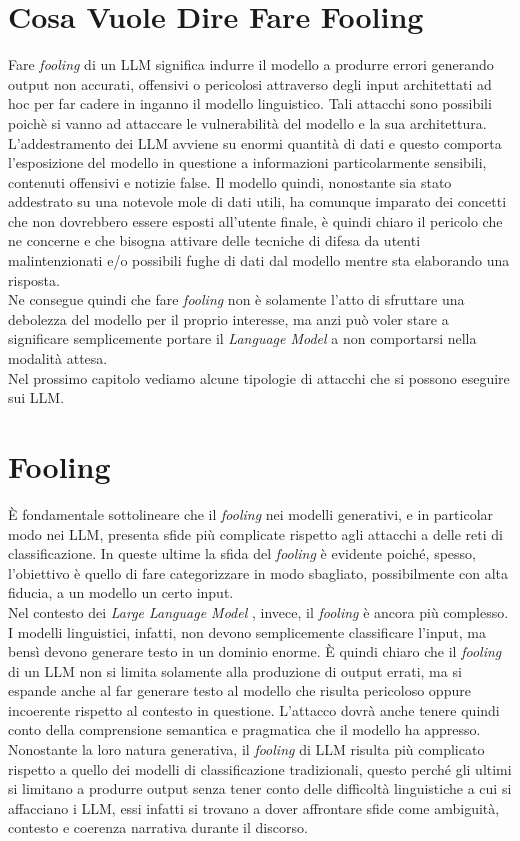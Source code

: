 \section{Cosa Vuole Dire Fare Fooling}
Fare \emph{fooling} di un LLM significa indurre il modello a produrre errori generando output non accurati, offensivi o pericolosi attraverso degli input architettati ad hoc per far cadere in inganno il modello linguistico. Tali attacchi sono possibili poich\`e si vanno ad attaccare le vulnerabilit\`a del modello e la sua architettura. L'addestramento dei LLM avviene su enormi quantit\`a di dati e questo comporta l'esposizione del modello in questione a informazioni particolarmente sensibili, contenuti offensivi e notizie false.
Il modello quindi, nonostante sia stato addestrato su una notevole mole di dati utili, ha comunque imparato dei concetti che non dovrebbero essere esposti all'utente finale, \`e quindi chiaro il pericolo che ne concerne e che bisogna attivare delle tecniche di difesa da utenti malintenzionati e/o possibili fughe di dati dal modello mentre sta elaborando una risposta.\\
Ne consegue quindi che fare \emph{fooling} non \`e solamente l'atto di sfruttare una debolezza del modello per il proprio interesse, ma anzi pu\`o voler stare a significare semplicemente portare il \emph{Language Model} a non comportarsi nella modalit\`a attesa.\\
Nel prossimo capitolo vediamo alcune tipologie di attacchi che si possono eseguire sui LLM.





\section{Fooling}
\`E fondamentale sottolineare che il \emph{fooling} nei modelli generativi, e in particolar modo nei LLM, presenta sfide pi\`u complicate rispetto agli attacchi a delle reti di classificazione. In queste ultime la sfida del \emph{fooling} \`e evidente poich\'e, spesso, l'obiettivo \`e quello di fare categorizzare in modo sbagliato, possibilmente con alta fiducia, a un modello un certo input.\\
Nel contesto dei \emph{Large Language Model} , invece, il \emph{fooling} \`e ancora pi\`u complesso. I modelli linguistici, infatti, non devono semplicemente classificare l'input, ma bens\`i devono generare testo in un dominio enorme. \`E quindi chiaro che il \emph{fooling} di un LLM non si limita solamente alla produzione di output errati, ma si espande anche al far generare testo al modello che risulta pericoloso oppure incoerente rispetto al contesto in questione. L'attacco dovr\`a anche tenere quindi conto della comprensione semantica e pragmatica che il modello ha appresso.\\
Nonostante la loro natura generativa, il \emph{fooling} di LLM risulta pi\`u complicato rispetto a quello dei modelli di classificazione tradizionali, questo perch\'e gli ultimi si limitano a produrre output senza tener conto delle difficolt\`a linguistiche a cui si affacciano i LLM, essi infatti si trovano a dover affrontare sfide come ambiguit\`a, contesto e coerenza narrativa durante il discorso.